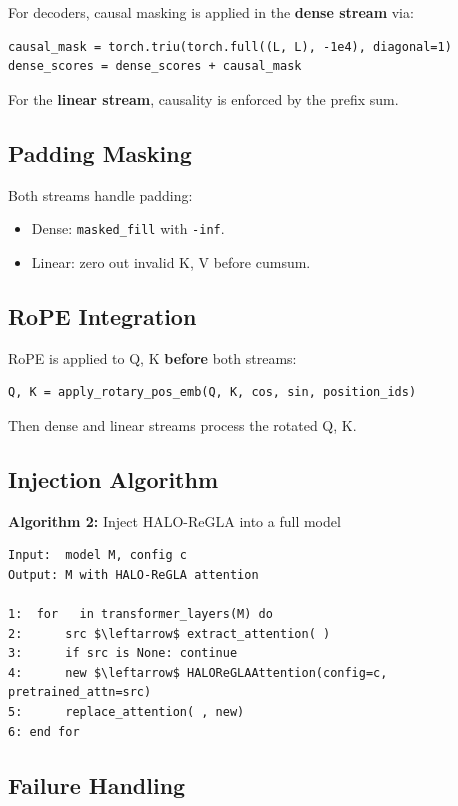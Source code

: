 For decoders, causal masking is applied in the \textbf{dense stream} via:

\begin{lstlisting}
causal_mask = torch.triu(torch.full((L, L), -1e4), diagonal=1)
dense_scores = dense_scores + causal_mask
\end{lstlisting}

For the \textbf{linear stream}, causality is enforced by the prefix sum.

\subsection{Padding Masking}

Both streams handle padding:
\begin{itemize}
\item Dense: \texttt{masked\_fill} with \texttt{-inf}.
\item Linear: zero out invalid K, V before cumsum.

\end{itemize}
\subsection{RoPE Integration}

RoPE is applied to Q, K \textbf{before} both streams:

\begin{lstlisting}
Q, K = apply_rotary_pos_emb(Q, K, cos, sin, position_ids)
\end{lstlisting}

Then dense and linear streams process the rotated Q, K.

\subsection{Injection Algorithm}

\textbf{Algorithm 2:} Inject HALO-ReGLA into a full model
\begin{lstlisting}
Input:  model M, config c
Output: M with HALO-ReGLA attention

1:  for   in transformer_layers(M) do
2:      src $\leftarrow$ extract_attention( )
3:      if src is None: continue
4:      new $\leftarrow$ HALOReGLAAttention(config=c, pretrained_attn=src)
5:      replace_attention( , new)
6: end for
\end{lstlisting}

\subsection{Failure Handling}

